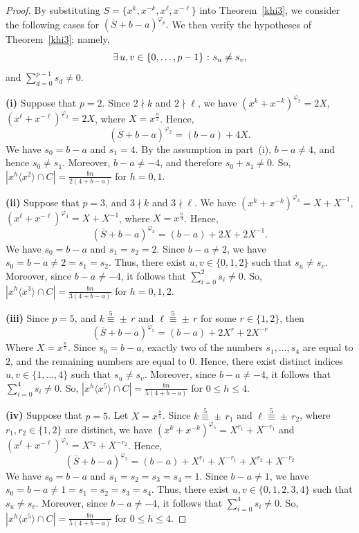 \documentclass[12pt]{article}
\begin{document}
\begin{proof}
	By substituting
	$
	S=\{x^k,x^{-k},x^\ell,x^{-\ell}\}
	$
	into Theorem~\ref{khi3}, we consider the following cases for
	$
	(\overline{S}+b-a)^{\varphi_p}.
	$ We then verify the hypotheses of Theorem~\ref{khi3}; namely,
		\begin{equation}\label{eq:susv2}
		\exists\,u,v\in\{0,\ldots,p-1\}\ \text : \ s_u \neq s_v, \end{equation}
	and $\sum_{d=0}^{p-1}s_d\neq0.$	
	
	\indent\textbf{(i)} Suppose that \(p=2\). Since $2\nmid k$ and $2\nmid \ell$, we have $(x^k+x^{-k})^{\varphi_2}=2X$,  $(x^\ell+x^{-\ell})^{\varphi_2}=2X$, where $X=x^\frac{n}{2}$. Hence,
	\[
	(\overline{S}+b-a)^{\varphi_2}=(b-a)+4X.
	\]
We have
$s_0=b-a$ and $s_1=4.$
By the assumption in part~(i), \(b-a\neq 4\), and hence
$s_0\neq s_1.$
Moreover, \(b-a\neq -4\), and therefore $s_0+s_1\neq 0.$ So,
$
\left|x^h\langle x^2\rangle\cap C\right|
=
\frac{bn}{2(4+b-a)}$ for $h=0,1.$

\indent\textbf{(ii)} Suppose that \(p=3\), and $3\nmid k$ and $3\nmid \ell$. We have $(x^k+x^{-k})^{\varphi_3}=X+X^{-1}$, $(x^\ell+x^{-\ell})^{\varphi_3}=X+X^{-1}$, where $X=x^\frac{n}{3}$. Hence,
\[
(\overline{S}+b-a)^{\varphi_3}=(b-a)+2X+2X^{-1}.
\]	
We have
$s_0=b-a$ and $s_1=s_2=2.$ Since \(b-a\neq 2\), we have \(s_0=b-a\neq2=s_1=s_2\). Thus, there exist \(u,v\in\{0,1,2\}\) such that \(s_u\neq s_v\). Moreover, since \(b-a\neq -4\), it follows that \(\sum_{i=0}^{2}s_i\neq 0\).
So, $
\left|x^h\langle x^3\rangle\cap C\right|
=
\frac{bn}{3(4+b-a)}$ for $h=0,1,2.$   	

\indent\textbf{(iii)} Since $p=5$, and $k\stackrel{5}{\equiv} \pm\, r$ and   $\ell\stackrel{5}{\equiv} \pm\, r$ for some $r\in\{1,2\}$, then
\[
(\overline{S}+b-a)^{\varphi_5}=(b-a)+2X^{r}+2X^{-r}
\]
 Where $X=x^\frac{n}{5}$. Since $s_0=b-a$, exactly two of the numbers $s_1,\ldots,s_{4}$ are equal to $2$, and the remaining numbers are equal to $0$. Hence, there exist distinct indices $u,v\in\{1,\ldots,4\}$ such that $s_u\neq s_v$. Moreover, since \(b-a\neq -4\), it follows that \(\sum_{i=0}^{4}s_i\neq 0\).
So, $
\left|x^h\langle x^5\rangle\cap C\right|
=
\frac{bn}{5(4+b-a)}$ for $0\le h\le 4$.

\indent\textbf{(iv)} Suppose that $p=5$. Let $X=x^\frac{n}{5}$. Since $k\stackrel{5}{\equiv} \pm\, r_1$ and $\ell\stackrel{5}{\equiv} \pm\, r_2$, where $r_1,r_2\in\{1,2\}$ are distinct, we have $(x^k+x^{-k})^{\varphi_5}=X^{r_1}+X^{-r_1}$ and $(x^\ell+x^{-\ell})^{\varphi_5}=X^{r_2}+X^{-r_2}$. Hence,
\[
(\overline{S}+b-a)^{\varphi_5}
=(b-a)+X^{r_1}+X^{-r_1}+X^{r_2}+X^{-r_2}
\]
We have
$s_0=b-a$ and $s_1=s_2=s_3=s_4=1.$ Since \(b-a\neq 1\), we have \(s_0=b-a\neq1=s_1=s_2=s_3=s_4\). Thus, there exist \(u,v\in\{0,1,2,3,4\}\) such that \(s_u\neq s_v\).  Moreover, since \(b-a\neq -4\), it follows that \(\sum_{i=0}^{4}s_i\neq 0\).
So, $
\left|x^h\langle x^5\rangle\cap C\right|
=
\frac{bn}{5(4+b-a)}$ for $0\le h\le 4$.


\end{proof}
\end{document}

